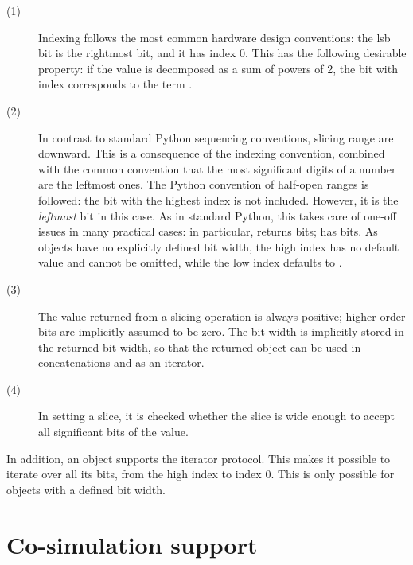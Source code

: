 \begin{description}
\item[(1)] Indexing follows the most common hardware design
	  conventions: the lsb bit is the rightmost bit, and it has
	  index 0. This has the following desirable property: if the
	   value is decomposed as a sum of powers of 2,
	  the bit with index  corresponds to the term
	  .

\item[(2)] In contrast to standard Python sequencing conventions,
	  slicing range are downward. This is a consequence of the
	  indexing convention, combined with the common convention
	  that the most significant digits of a number are the
	  leftmost ones. The Python convention of half-open ranges is
	  followed: the bit with the highest index is not
	  included. However, it is the \emph{leftmost} bit in this
	  case. As in standard Python, this takes care of one-off
	  issues in many practical cases: in particular,
	   returns  bits;
	   has 
	  bits. As  objects have no explicitly defined
	  bit width, the high index  has no default value and
	  cannot be omitted, while the low index  defaults to
	  .

\item[(3)] The value returned from a slicing operation is always
	  positive; higher order bits are implicitly assumed to be
	  zero. The bit width is implicitly stored in the returned bit
	  width, so that the returned object can be used in
	  concatenations and as an iterator.

\item[(4)] In setting a slice, it is checked whether the slice is wide
	  enough to accept all significant bits of the value.
\end{description}



In addition, an  object supports the iterator protocol. This
makes it possible to iterate over all its bits, from the high index to
index 0. This is only possible for  objects with a
defined bit width.


\section{Co-simulation support \label{ref-cosim}}

\subsection{\myhdl\ \label{ref-cosim-myhdl}}

